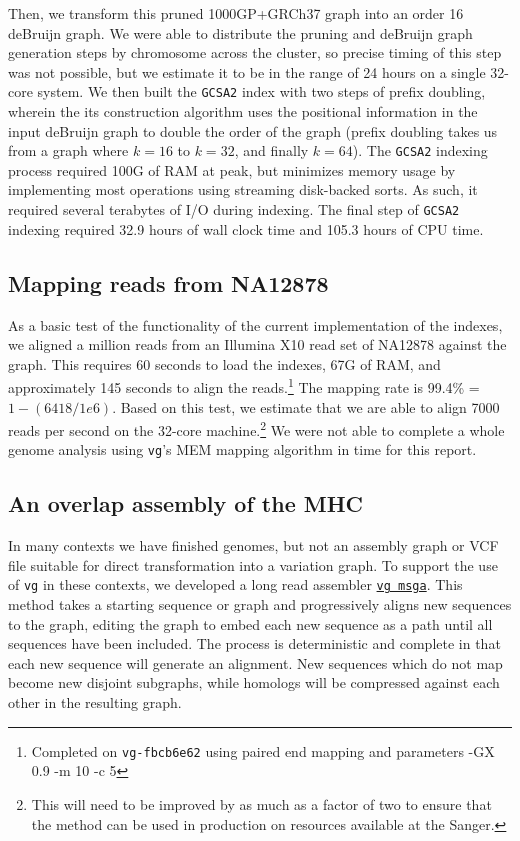 \documentclass{article}
\begin{document}
Then, we transform this pruned 1000GP+GRCh37 graph into an order 16 deBruijn graph.
We were able to distribute the pruning and deBruijn graph generation steps by chromosome across the cluster, so precise timing of this step was not possible, but we estimate it to be in the range of 24 hours on a single 32-core system.
We then built the {\tt GCSA2} index with two steps of prefix doubling, wherein the its construction algorithm uses the positional information in the input deBruijn graph to double the order of the graph (prefix doubling takes us from a graph where $k = 16$ to $k = 32$, and finally $k = 64$).
The {\tt GCSA2} indexing process required 100G of RAM at peak, but minimizes memory usage by implementing most operations using streaming disk-backed sorts.
As such, it required several terabytes of I/O during indexing.
The final step of {\tt GCSA2} indexing required 32.9 hours of wall clock time and 105.3 hours of CPU time.

\subsection{Mapping reads from NA12878}

As a basic test of the functionality of the current implementation of the indexes, we aligned a million reads from an Illumina X10 read set of NA12878 against the graph.
This requires 60 seconds to load the indexes, 67G of RAM, and approximately 145 seconds to align the reads.\footnote{Completed on {\tt vg-fbcb6e62} using paired end mapping and parameters -GX 0.9 -m 10 -c 5}
The mapping rate is 99.4\% = $1 - (6418 / 1e6)$.
Based on this test, we estimate that we are able to align 7000 reads per second on the 32-core machine.\footnote{This will need to be improved by as much as a factor of two to ensure that the method can be used in production on resources available at the Sanger.}
We were not able to complete a whole genome analysis using {\tt vg}'s MEM mapping algorithm in time for this report.

\subsection{An overlap assembly of the MHC}
\label{sec:MHC}

In many contexts we have finished genomes, but not an assembly graph or VCF file suitable for direct transformation into a variation graph. 
To support the use of {\tt vg} in these contexts,
we developed a long read assembler \href{https://github.com/vgteam/vg/wiki/Long-read-assemblies-using-vg-msga}{\tt vg msga}.
This method takes a starting sequence or graph and progressively aligns new sequences to the graph, editing the graph to embed each new sequence as a path until all sequences have been included.
The process is deterministic and complete in that each new sequence will generate an alignment.
New sequences which do not map become new disjoint subgraphs, while homologs will be compressed against each other in the resulting graph.
\end{document}
